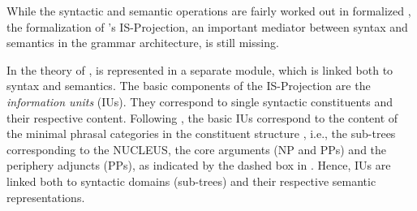 \documentclass[output=paper,colorlinks,citecolor=brown]{langscibook}
\begin{document}
While the syntactic and semantic operations are fairly worked out in formalized , the formalization of 's IS-Projection, an important mediator between syntax and semantics in the grammar architecture, is still missing.

In the theory of  \citep{vanvalin:05},  is represented in a separate module, which is linked both to syntax and semantics. The basic components of the IS-Projection are the {\emph{information units}} (IUs). They correspond to single syntactic constituents \citep[][]{vanvalin:05,bentley:23} and their respective content. Following \citet{lambrecht:94}, the basic IUs correspond to the content of the minimal phrasal categories in the constituent structure \citep[][78]{vanvalin:05}, i.e., the  sub-trees corresponding to the NUCLEUS, the core arguments (NP and PPs) and the periphery adjuncts (PPs), as indicated by the dashed box in . Hence, IUs are linked both to syntactic domains (sub-trees) and their respective semantic representations. 
\end{document}
